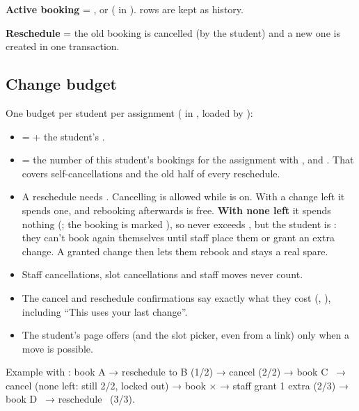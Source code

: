 \textbf{Active booking} = ,  or  ( in ).  rows are kept as history.

\textbf{Reschedule} = the old booking is cancelled (by the student) and a new one is created in one transaction.

\subsection{Change budget}\label{sec:change-budget}

One budget per student per assignment ( in , loaded by ):

\begin{itemize}
  \item {} =  + the student's .
  \item {} = the number of this student's bookings for the assignment with ,  and . That covers self-cancellations and the old half of every reschedule.
  \item A reschedule needs . Cancelling is allowed while  is on. With a change left it spends one, and rebooking afterwards is free. \textbf{With none left} it spends nothing (; the booking is marked ), so  never exceeds , but the student is : they can't book again themselves until staff place them or grant an extra change. A granted change then lets them rebook and stays a real spare.
  \item Staff cancellations, slot cancellations and staff moves never count.
  \item The cancel and reschedule confirmations say exactly what they cost (, ), including ``This uses your last change''.
  \item The student's page offers  (and the slot picker, even from a  link) only when a move is possible.
\end{itemize}

Example with : book A → reschedule to B (1/2) → cancel (2/2) → book C \checkmark\ → cancel (none left: still 2/2, locked out) → book $\times$ → staff grant 1 extra (2/3) → book D \checkmark\ → reschedule \checkmark\ (3/3).


